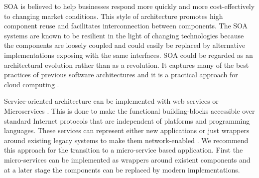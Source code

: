 	SOA is believed to help businesses respond more quickly and more cost-effectively to changing market conditions. This style of architecture promotes high component reuse and facilitates interconnection between components. The SOA systems are known to be resilient in the light of changing technologies because the components are loosely coupled and could easily be replaced by alternative implementations exposing with the same interfaces.	SOA could be regarded as an architectural evolution rather than as a revolution. It captures many of the best practices of previous software architectures and it is a practical approach for cloud computing \citep{velte2019cloud}.
	
	Service-oriented architecture can be implemented with web services or Microservices \citep{brandner2004web}. This is done to make the functional building-blocks accessible over standard Internet protocols that are independent of platforms and programming languages. These services can represent either new applications or just wrappers around existing legacy systems to make them network-enabled \citep{channabasavaiah2003migrating}. We recommend this approach for the transition to a micro-service based application. First the micro-services can be implemented as wrappers around existent components and at a later stage the components can be replaced by modern implementations. 